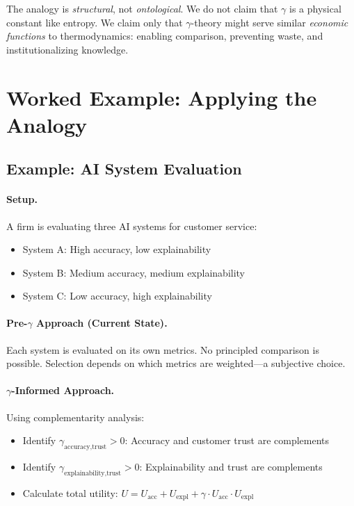 \begin{tcolorbox}[colback=red!5!white, colframe=red!75!black,
    title=Honest Assessment]
The analogy is \textit{structural}, not \textit{ontological}. We do not claim
that $\gamma$ is a physical constant like entropy. We claim only that $\gamma$-theory
might serve similar \textit{economic functions} to thermodynamics: enabling
comparison, preventing waste, and institutionalizing knowledge.
\end{tcolorbox}


\section{Worked Example: Applying the Analogy}
\label{sec:thermo-example}

\subsection{Example: AI System Evaluation}

\paragraph{Setup.} A firm is evaluating three AI systems for customer service:
\begin{itemize}
    \item System A: High accuracy, low explainability
    \item System B: Medium accuracy, medium explainability
    \item System C: Low accuracy, high explainability
\end{itemize}

\paragraph{Pre-$\gamma$ Approach (Current State).}
Each system is evaluated on its own metrics. No principled comparison is possible.
Selection depends on which metrics are weighted---a subjective choice.

\paragraph{$\gamma$-Informed Approach.}
Using complementarity analysis:
\begin{itemize}
    \item Identify $\gamma_{\text{accuracy},\text{trust}} > 0$: Accuracy and
    customer trust are complements
    \item Identify $\gamma_{\text{explainability},\text{trust}} > 0$:
    Explainability and trust are complements
    \item Calculate total utility: $U = U_{\text{acc}} + U_{\text{expl}} +
    \gamma \cdot U_{\text{acc}} \cdot U_{\text{expl}}$
\end{itemize}

